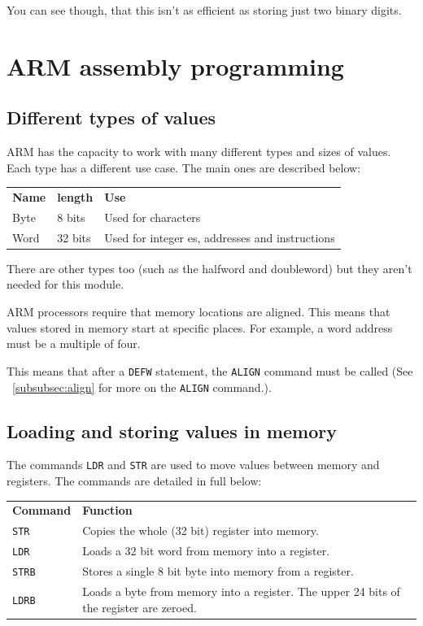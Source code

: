 \documentclass{article}
\begin{document}
You can see though, that this isn't as efficient as storing just two binary
digits.

\section{ARM assembly programming}

\subsection{Different types of values}

ARM has the capacity to work with many different types and sizes of values. Each type has a different use case. The main ones are described below:

\begin{tabularx}{\textwidth}{l l X}
	{\bf Name} & {\bf length} & {\bf Use}\\
	Byte & 8 bits & Used for characters\\
	Word & 32 bits & Used for integer es, addresses and instructions\\
\end{tabularx}

There are other types too (such as the halfword and doubleword) but they aren't needed for this module.

ARM processors require that memory locations are aligned. This means that values stored in memory start at specific places. For example, a word address must be a multiple of four.

This means that after a {\tt DEFW} statement, the {\tt ALIGN} command must be called (See ~\ref{subsubsec:align} for more on the {\tt ALIGN} command.).

\subsection{Loading and storing values in memory}

The commands {\tt LDR} and {\tt STR} are used to move values between memory and registers. The commands are detailed in full below:

\begin{tabularx}{\textwidth}{l X}
	{\bf Command} & {\bf Function}\\
	{\tt STR} & Copies the whole (32 bit) register into memory.\\
	{\tt LDR} & Loads a 32 bit word from memory into a register.\\
	{\tt STRB} & Stores a single 8 bit byte into memory from a register.\\
	{\tt LDRB} & Loads a byte from memory into a register. The upper 24 bits of the register are zeroed.\\
\end{tabularx}
\end{document}
